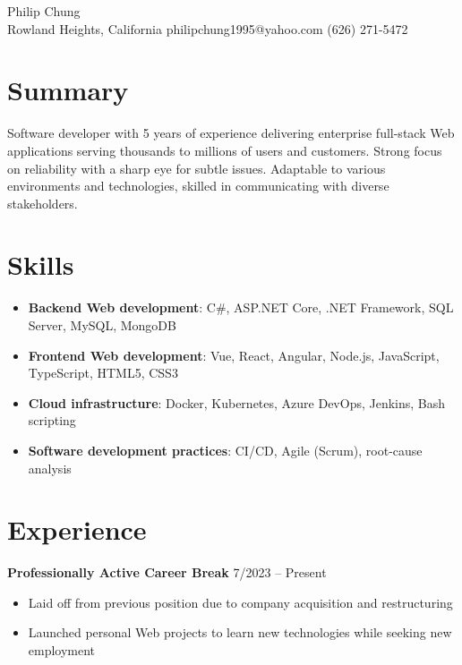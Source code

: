 \documentclass[12pt]{article}
\newcommand{\primaryheader}[4]{
	\textbf{#1}
	\ifthenelse{\equal{#3}{}}{}{%
		\symbol{"B7} #3 \ifthenelse{\equal{#4}{}}{}{(#4)}
	}
	\hfill #2
}
\begin{document}
	\begin{center}
		{\headerfont\fontsize{24pt}{24pt}\selectfont Philip Chung} \\ \vspace{0.5em}
		Rowland Heights, California  philipchung1995@yahoo.com  (626) 271-5472
	\end{center}

	\section*{Summary}

	Software developer with 5 years of experience delivering enterprise full-stack Web applications serving thousands to millions of users and customers. Strong focus on reliability with a sharp eye for subtle issues. Adaptable to various environments and technologies, skilled in communicating with diverse stakeholders.

	\section*{Skills}

	\newcommand{\skillitem}[2]{\item \textbf{#1}: #2}

	\begin{itemize}[left=0.25in .. 0.25in,label={},itemindent=-0.25in]
		\skillitem{Backend Web development}{C\#, ASP.NET Core, .NET Framework, SQL Server, MySQL, MongoDB}
		\skillitem{Frontend Web development}{Vue, React, Angular, Node.js, JavaScript, TypeScript, HTML5, CSS3}
		\skillitem{Cloud infrastructure}{Docker, Kubernetes, Azure DevOps, Jenkins, Bash scripting}
		\skillitem{Software development practices}{CI/CD, Agile (Scrum), root-cause analysis}
	\end{itemize}

	\section*{Experience}

	\primaryheader{Professionally Active Career Break}{7/2023 -- Present}{}{}

	\begin{itemize}
		\item Laid off from previous position due to company acquisition and restructuring
		\item Launched personal Web projects to learn new technologies while seeking new employment
	\end{itemize}
\end{document}
